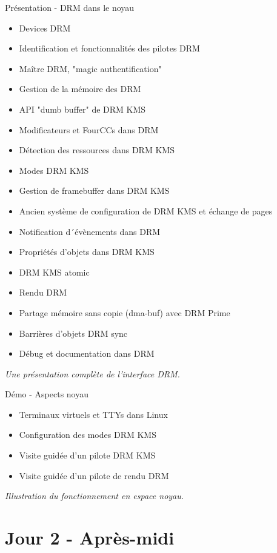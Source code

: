 \documentclass[a4paper,12pt,obeyspaces,spaces,hyphens]{article}
\begin{document}
\feagendatwocolumn
{Présentation - DRM dans le noyau}
{
  \begin{itemize}
  \item Devices DRM
  \item Identification et fonctionnalités des pilotes DRM
  \item Maître DRM, "magic authentification"
  \item Gestion de la mémoire des DRM
  \item API "dumb buffer" de DRM KMS
  \item Modificateurs et FourCCs dans DRM
  \item Détection des ressources dans DRM KMS
  \item Modes DRM KMS
  \item Gestion de framebuffer dans DRM KMS
  \item Ancien système de configuration de DRM KMS et échange de pages
  \item Notification d´évènements dans DRM
  \item Propriétés d'objets dans DRM KMS
  \item DRM KMS atomic
  \item Rendu DRM
  \item Partage mémoire sans copie (dma-buf) avec DRM Prime
  \item Barrières d'objets DRM sync
  \item Débug et documentation dans DRM
  \end{itemize}
  \vspace{0.5em}
  {\em Une présentation complète de l'interface DRM.}
}
{Démo - Aspects noyau}
{
  \begin{itemize}
  \item Terminaux virtuels et TTYs dans Linux
  \item Configuration des modes DRM KMS
  \item Visite guidée d'un pilote DRM KMS
  \item Visite guidée d'un pilote de rendu DRM
  \end{itemize}
  \vspace{0.5em}
  {\em Illustration du fonctionnement en espace noyau.}
}

\section{Jour 2 - Après-midi}
\end{document}
